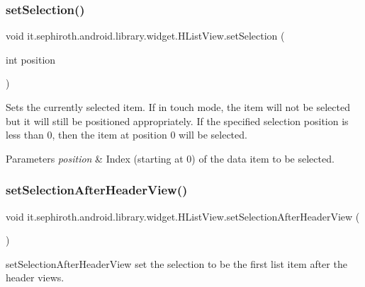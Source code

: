 \subsubsection{\texorpdfstring{set\+Selection()}{setSelection()}}
{\footnotesize\ttfamily void it.\+sephiroth.\+android.\+library.\+widget.\+H\+List\+View.\+set\+Selection (\begin{DoxyParamCaption}\item[{int}]{position }\end{DoxyParamCaption})}

Sets the currently selected item. If in touch mode, the item will not be selected but it will still be positioned appropriately. If the specified selection position is less than 0, then the item at position 0 will be selected.


\begin{DoxyParams}{Parameters}
{\em position} & Index (starting at 0) of the data item to be selected. \\
\hline
\end{DoxyParams}
\mbox{\label{classit_1_1sephiroth_1_1android_1_1library_1_1widget_1_1_h_list_view_aaa1a3ef829fb6003b0891e082513a46c}} 
\subsubsection{\texorpdfstring{set\+Selection\+After\+Header\+View()}{setSelectionAfterHeaderView()}}
{\footnotesize\ttfamily void it.\+sephiroth.\+android.\+library.\+widget.\+H\+List\+View.\+set\+Selection\+After\+Header\+View (\begin{DoxyParamCaption}{ }\end{DoxyParamCaption})}

set\+Selection\+After\+Header\+View set the selection to be the first list item after the header views. \mbox{\label{classit_1_1sephiroth_1_1android_1_1library_1_1widget_1_1_h_list_view_a7e1831e41e63d13b8c1a5bde74f32fa9}} 
